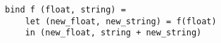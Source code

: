 \begin{verbatim}
bind f (float, string) =
    let (new_float, new_string) = f(float)
    in (new_float, string + new_string)
\end{verbatim}
